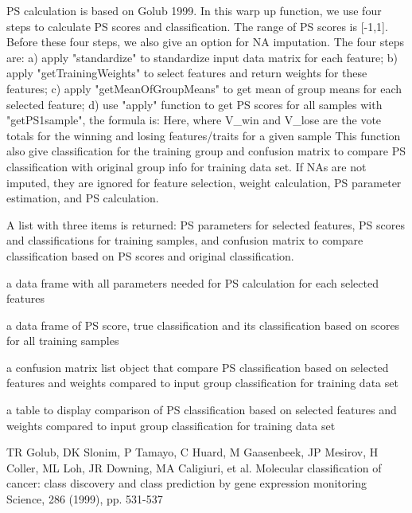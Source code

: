 \documentclass[letterpaper]{book}
\begin{document}
%
\begin{Details}\relax
PS calculation is based on Golub 1999. In this warp up function, we use four steps to calculate 
PS scores and classification. The range of PS scores is [-1,1]. Before these four steps, we also give an option
for NA imputation. The four steps are:
a) apply "standardize" to standardize input data matrix for each feature;
b) apply "getTrainingWeights" to select features and return weights for these features;
c) apply "getMeanOfGroupMeans" to get mean of group means for each selected feature;
d) use "apply" function to get PS scores for all samples with "getPS1sample", the formula is:
Here, where V\_win and V\_lose are the vote totals for the winning and losing features/traits for a given sample
This function also give classification for the training group and confusion matrix to compare PS classification
with original group info for training data set.
If NAs are not imputed, they are ignored for feature selection, weight calculation, PS parameter estimation,
and PS calculation.
\end{Details}
%
\begin{Value}
A list with three items is returned: PS parameters for selected features, PS scores and classifications for training samples, and confusion matrix to compare classification based on PS scores and original classification.
\begin{ldescription}
\item[\code{PS\_pars}] a data frame with all parameters needed for PS calculation for each selected features
\item[\code{PS\_train}] a data frame of PS score, true classification and its classification based on scores for all training samples
\item[\code{classCompare}] a confusion matrix list object that compare PS classification based on selected features and weights compared to input group classification for training data set
\item[\code{classTable}] a table to display comparison of PS classification based on selected features and weights compared to input group classification for training data set
\end{ldescription}
\end{Value}
%
\begin{References}\relax
TR Golub, DK Slonim, P Tamayo, C Huard, M Gaasenbeek, JP Mesirov, H Coller, ML Loh, JR Downing, MA Caligiuri, et al.
Molecular classification of cancer: class discovery and class prediction by gene expression monitoring
Science, 286 (1999), pp. 531-537
\end{References}
\end{document}
